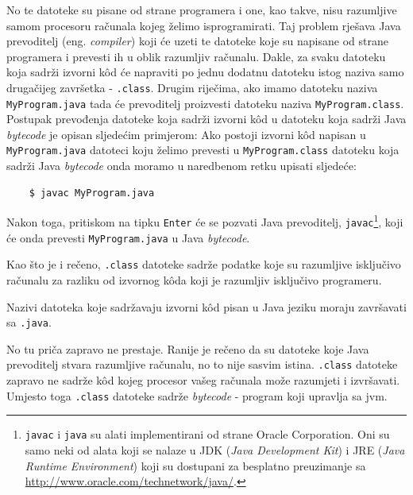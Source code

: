 No te datoteke su pisane od strane programera i one, kao takve, nisu razumljive samom procesoru računala kojeg želimo isprogramirati. Taj problem rješava Java prevoditelj (eng. \emph{compiler}) koji će uzeti te datoteke koje su napisane od strane programera i prevesti ih u oblik razumljiv računalu. Dakle, za svaku datoteku koja sadrži izvorni kôd će napraviti po jednu dodatnu datoteku istog naziva samo drugačijeg završetka - \texttt{.class}. Drugim riječima, ako imamo datoteku naziva \texttt{MyProgram.java} tada će prevoditelj proizvesti datoteku naziva \texttt{MyProgram.class}. Postupak prevođenja datoteke koja sadrži izvorni kôd u datoteku koja sadrži Java \emph{bytecode} je opisan sljedećim primjerom: Ako postoji izvorni kôd napisan u \texttt{MyProgram.java} datoteci koju želimo prevesti u \texttt{MyProgram.class} datoteku koja sadrži Java \emph{bytecode} onda moramo u naredbenom retku upisati sljedeće:

\begin{lstlisting}
    $ javac MyProgram.java
\end{lstlisting}

Nakon toga, pritiskom na tipku \texttt{Enter} će se pozvati Java prevoditelj, \texttt{javac}\footnote{\label{ftn:javaandjavac}\texttt{javac} i \texttt{java} su alati implementirani od strane Oracle Corporation. Oni su samo neki od alata koji se nalaze u JDK (\emph{Java Development Kit}) i JRE (\emph{Java Runtime Environment}) koji su dostupani za besplatno preuzimanje sa \url{http://www.oracle.com/technetwork/java/}.}, koji će onda prevesti \texttt{MyProgram.java} u Java \emph{bytecode}.

Kao što je i rečeno, \texttt{.class} datoteke sadrže podatke koje su razumljive isključivo računalu za razliku od izvornog kôda koji je razumljiv isključivo programeru.

\begin{importantbox}
    Nazivi datoteka koje sadržavaju izvorni kôd pisan u Java jeziku moraju završavati sa \texttt{.java}.
\end{importantbox}

No tu priča zapravo ne prestaje. Ranije je rečeno da su datoteke koje Java prevoditelj stvara razumljive računalu, no to nije sasvim istina. \texttt{.class} datoteke zapravo ne sadrže kôd kojeg procesor vašeg računala može razumjeti i izvršavati. Umjesto toga \texttt{.class} datoteke sadrže \emph{bytecode} - program koji upravlja sa \gls{jvm}.

